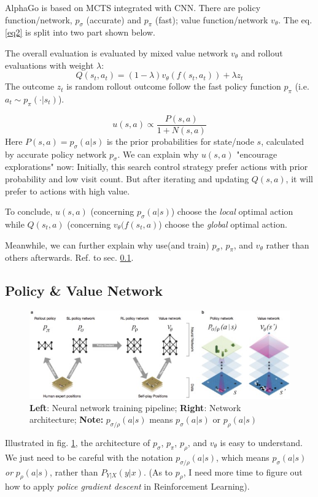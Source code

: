 \documentclass{mcmthesis}
\begin{document}
AlphaGo is based on MCTS integrated with CNN. There are policy function/network, $p_\sigma$ (accurate) and $p_\pi$ (fast); value function/network $v_\theta$. The eq. \eqref{eq2} is split into two part shown below.

The overall evaluation is evaluated by mixed value network $v_\theta$ and rollout evaluations with weight $\lambda$:
\begin{equation}
	Q(s_t,a_t)=(1-\lambda)v_\theta(f(s_t,a_t)) + \lambda z_t
\end{equation}
The outcome $z_t$ is random rollout outcome follow the fast policy function $p_\pi$ (i.e. $a_t \sim p_\pi(\cdot | s_t)$).

\begin{equation}
	u(s,a)\propto \frac{P(s,a)}{1+N(s,a)}
\end{equation}
Here $P(s,a)=p_\sigma(a|s)$ is the prior probabilities for state/node $s$, calculated by accurate policy network $p_\sigma$. We can explain why $u(s,a)$ "encourage explorations" now: Initially, this search control strategy prefer actions with prior probability and low visit count. But after iterating and updating $Q(s,a)$, it will prefer to actions with high value.

 
To conclude, $u(s,a)$ (concerning $p_\sigma(a|s)$) choose the \textit{local} optimal action while $Q(s_t,a)$ (concerning $v_\theta(f(s_t,a)$) choose the \textit{global} optimal action.


Meanwhile, we can further explain why use(and train) $p_\sigma$, $p_\pi$, and $v_\theta$ rather than others afterwards. Ref. to sec. \ref{sec2}.


\subsection{Policy \& Value Network}\label{sec2}
\begin{figure}[]
	\centering
	\includegraphics[width=.8\columnwidth]{./fig1.jpg}
	\caption[network]{\textbf{Left}: Neural network training pipeline; \textbf{Right}: Network architecture; 
	\textbf{Note:} $p_{\sigma/\rho}(a|s) $ means $p_\sigma(a|s)$ or $p_\rho(a|s)$}\label{fig1}
\end{figure}
Illustrated in fig. \ref{fig1}, the architecture of $p_\sigma$, $p_\pi$, $p_\rho$, and $v_\theta$ is easy to understand. We just need  to be careful with the notation $p_{\sigma/\rho}(a|s) $, which means  $p_\sigma(a|s)$ \textit{or} $p_\rho(a|s)$, rather than $P_{Y|X}(y|x)$. (As to $p_\rho$, I  need more  time to figure out how to apply \textit{police gradient descent} in Reinforcement Learning). 
\end{document}
